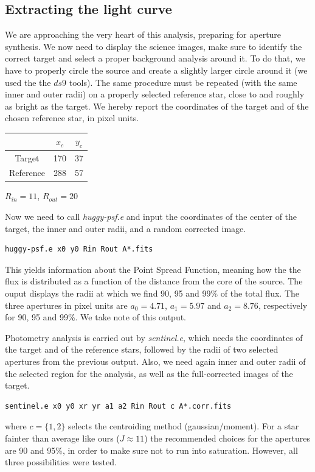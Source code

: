 \documentclass[a4paper,11pt,twocolumn]{article}
\begin{document}
\subsection{Extracting the light curve}
We are approaching the very heart of this analysis, preparing for 
aperture synthesis. We now need to display the science images, make 
sure to identify the correct target and select a proper background 
analysis around it. To do that, we have to properly circle the source 
and create a slightly larger circle around it (we used the the $ds9$ tools).
The same procedure must be repeated (with the same inner and outer radii) 
on a properly selected reference star, close to and roughly as bright 
as the target. We hereby report the coordinates of the target and of the 
chosen reference star, in pixel units.
\begin{center}
    \begin{tabular}{ccc}
    \hline
     & $x_c$ & $y_c$ \\
    \hline
    Target    &  170  &  37    \\
    Reference & 288 & 57  \\
    \hline
    \end{tabular}

    \medskip

    $R_{in} = 11$, $R_{out} = 20$
\end{center}
Now we need to call \textit{huggy-psf.e} and input the coordinates of the 
center of the target, the inner and outer radii, and a random corrected 
image.
\begin{lstlisting}
huggy-psf.e x0 y0 Rin Rout A*.fits
\end{lstlisting}
This yields information about the Point Spread Function, meaning how the 
the flux is distributed as a function of the distance from the core of 
the source. The ouput displays the radii at which we find 90, 95 and 99\%
of the total flux. The three apertures in pixel units are $a_0=4.71$, 
$a_1=5.97$ and $a_2=8.76$, respectively for 90, 95 and 99\%. 
We take note of this output. 


Photometry analysis is carried out by \textit{sentinel.e}, which needs 
the coordinates of the target and of the reference stars, followed by 
the radii of two selected apertures from the previous output. Also, we need 
again inner and outer radii of the selected region for the analysis, as well 
as the full-corrected images of the target. 
\begin{lstlisting}
sentinel.e x0 y0 xr yr a1 a2 Rin Rout c A*.corr.fits
\end{lstlisting}
where $c=\{1,2\}$ selects the centroiding method (gaussian/moment). For a star
fainter than average like ours ($J\approx 11$) the recommended choices for 
the apertures are 90 and 95\%, in order to make sure not to run into 
saturation. However, all three possibilities were tested. 
\end{document}
